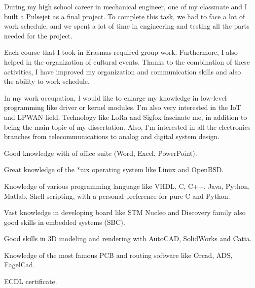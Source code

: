 \documentclass[english,a4paper]{europasscv}
\begin{document}
\begin{europasscv}
		 {
			\begin{ecvitemize}
				\item During my high school career in mechanical engineer, one
					of my classmate and I built a Pulsejet as a final project.
					To complete this task, we had to face a lot of work schedule,
					and we spent a lot of time in engineering and testing all
					the parts needed for the project.
				\item Each course that I took in Erasmus required group work.
					Furthermore, I also helped in the organization of cultural
					events. Thanks to the combination of these activities, I
					have improved my organization and communication skills and
					also the ability to work schedule.
			\end{ecvitemize}
		}

		 {
			\begin{ecvitemize}
				\item In my work occupation, I would like to enlarge my
				knowledge in low-level programming like driver or kernel modules.
				I'm also very interested in the IoT and LPWAN field.
				Technology like LoRa and Sigfox fascinate me, in addition to
				being the main topic of my dissertation.  Also, I'm interested
				in all the electronics branches from telecommunications to
				analog and digital system design.
			\end{ecvitemize}}

		 {
			\begin{ecvitemize}
				\item Good knowledge with of office suite (Word, Excel, PowerPoint).
				\item Great knowledge of the *nix operating system like Linux
					and OpenBSD.
				\item Knowledge of various programming language like VHDL, C,
					C++, Java, Python, Matlab, Shell
					scripting, with a personal preference for pure C and Python.
				\item Vast knowledge in developing board like STM Nucleo and
					Discovery family also good skills in embedded systems (SBC).
				\item Good skills in 3D modeling and rendering with AutoCAD,
					SolidWorks and Catia.
				\item Knowledge of the most famous PCB and routing software like
					Orcad, ADS, EagelCad.
				\item ECDL certificate.
			\end{ecvitemize}
		}


\end{europasscv}
\end{document}
